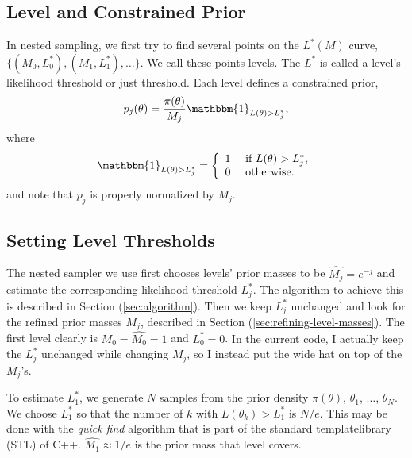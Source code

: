 \documentclass[letterpaper, preprint]{aastex}
\newcommand{\qer}[1]{{\color{red}#1}}
\begin{document}
\subsection{Level and Constrained Prior}
In nested sampling, we first try to find several points on the $L^*(M)$ curve, $\{(M_0, L_0^*),(M_1,L_1^*),\ldots\}$. We call these points levels. The $L^*$ is called a level's likelihood threshold or just threshold. Each level defines a constrained prior,
\begin{equation} 
p_{j}(\theta) = \frac{\pi(\theta)}{M_j}\mathbbm{1}_{L(\theta)>L_j^*},
\label{eq:constrained-prior}
\end{equation}
where
\begin{eqnarray*}
\mathbbm{1}_{L(\theta)>L_j^*} = \left\{ \begin{array}{ll}
               1 & \mbox{ if } L(\theta)>L_j^*,\\
               0 & \mbox{ otherwise.} \end{array}  \right.
\end{eqnarray*}
and note that $p_{j}$ is properly normalized by $M_j$. 

\subsection{Setting Level Thresholds}
\label{sec:constructing}
The nested sampler we use first chooses levels' prior masses to be $\widehat{M_j} = e^{-j}$ and estimate the corresponding likelihood threshold $L^*_j$. The algorithm to achieve this is described in Section (\ref{sec:algorithm}). Then we keep $L^*_j$ unchanged and look for the refined prior masses $M_j$, described in Section (\ref{sec:refining-level-masses}). The first level clearly is $M_0 =\widehat{M_0}= 1$ and $L^*_0 = 0$. \qer{In the current code, I actually keep the $L^*_j$ unchanged while changing $M_j$, so I instead put the wide hat on top of the $M_j$'s.}

To estimate $L^*_1$, we generate $N$ samples from the prior density $\pi(\theta)$, $\theta_1$, $\ldots$, $\theta_N$. We choose $L^*_1$ so that the number of $k$ with $L(\theta_k) > L^*_1$ is $N/e$. This may be done with the {\em quick find} algorithm that is part of the standard templatelibrary (STL) of C++. $\widehat{M_1}\approx1/e$ is the prior mass that level  covers. 
\end{document}

